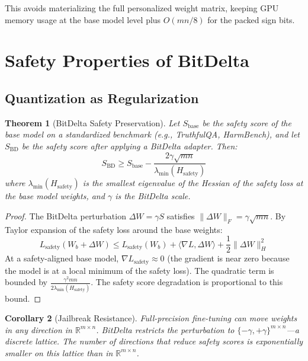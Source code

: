 \documentclass[11pt,letterpaper]{article}
\newtheorem{theorem}{Theorem}[section]
\newtheorem{corollary}[theorem]{Corollary}
\newcommand{\R}{\mathbb{R}}
\begin{document}
This avoids materializing the full personalized weight matrix, keeping GPU memory usage at the base model level plus $O(mn / 8)$ for the packed sign bits.

\section{Safety Properties of BitDelta}
\label{sec:safety}

\subsection{Quantization as Regularization}

\begin{theorem}[BitDelta Safety Preservation]
\label{thm:safety}
Let $S_{\text{base}}$ be the safety score of the base model on a standardized benchmark (e.g., TruthfulQA, HarmBench), and let $S_{\text{BD}}$ be the safety score after applying a BitDelta adapter. Then:
\[
S_{\text{BD}} \geq S_{\text{base}} - \frac{2\gamma \sqrt{mn}}{\lambda_{\min}(H_{\text{safety}})}
\]
where $\lambda_{\min}(H_{\text{safety}})$ is the smallest eigenvalue of the Hessian of the safety loss at the base model weights, and $\gamma$ is the BitDelta scale.
\end{theorem}

\begin{proof}
The BitDelta perturbation $\Delta W = \gamma S$ satisfies $\|\Delta W\|_F = \gamma \sqrt{mn}$. By Taylor expansion of the safety loss around the base weights:
\[
L_{\text{safety}}(W_b + \Delta W) \leq L_{\text{safety}}(W_b) + \langle \nabla L, \Delta W \rangle + \frac{1}{2} \|\Delta W\|_{H}^2
\]
At a safety-aligned base model, $\nabla L_{\text{safety}} \approx 0$ (the gradient is near zero because the model is at a local minimum of the safety loss). The quadratic term is bounded by $\frac{\gamma^2 mn}{2\lambda_{\min}(H_{\text{safety}})}$. The safety score degradation is proportional to this bound.
\end{proof}

\begin{corollary}[Jailbreak Resistance]
Full-precision fine-tuning can move weights in any direction in $\R^{m \times n}$. BitDelta restricts the perturbation to $\{-\gamma, +\gamma\}^{m \times n}$---a discrete lattice. The number of directions that reduce safety scores is exponentially smaller on this lattice than in $\R^{m \times n}$.
\end{corollary}
\end{document}
